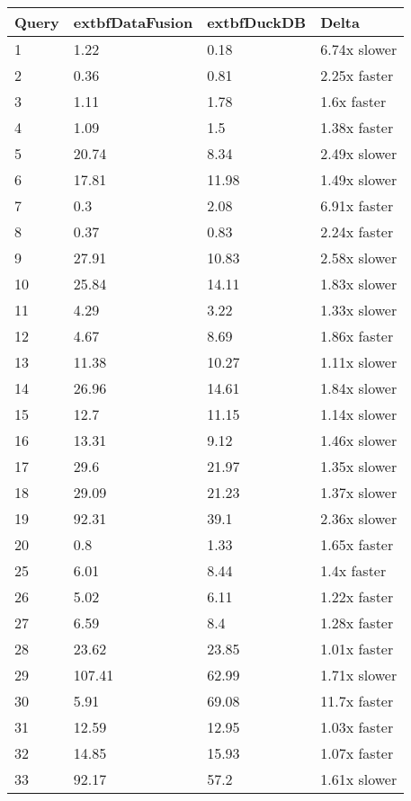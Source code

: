 \begin{table}[h]
\centering
\begin{tabular}{|l|l|l|l|}
\hline
Query & 	extbf{DataFusion} & 	extbf{DuckDB} & Delta \\
\hline
1 & 1.22 & 0.18 & 6.74x slower \\
\hline
2 & 0.36 & 0.81 & 2.25x faster \\
\hline
3 & 1.11 & 1.78 & 1.6x faster \\
\hline
4 & 1.09 & 1.5 & 1.38x faster \\
\hline
5 & 20.74 & 8.34 & 2.49x slower \\
\hline
6 & 17.81 & 11.98 & 1.49x slower \\
\hline
7 & 0.3 & 2.08 & 6.91x faster \\
\hline
8 & 0.37 & 0.83 & 2.24x faster \\
\hline
9 & 27.91 & 10.83 & 2.58x slower \\
\hline
10 & 25.84 & 14.11 & 1.83x slower \\
\hline
11 & 4.29 & 3.22 & 1.33x slower \\
\hline
12 & 4.67 & 8.69 & 1.86x faster \\
\hline
13 & 11.38 & 10.27 & 1.11x slower \\
\hline
14 & 26.96 & 14.61 & 1.84x slower \\
\hline
15 & 12.7 & 11.15 & 1.14x slower \\
\hline
16 & 13.31 & 9.12 & 1.46x slower \\
\hline
17 & 29.6 & 21.97 & 1.35x slower \\
\hline
18 & 29.09 & 21.23 & 1.37x slower \\
\hline
19 & 92.31 & 39.1 & 2.36x slower \\
\hline
20 & 0.8 & 1.33 & 1.65x faster \\
\hline
25 & 6.01 & 8.44 & 1.4x faster \\
\hline
26 & 5.02 & 6.11 & 1.22x faster \\
\hline
27 & 6.59 & 8.4 & 1.28x faster \\
\hline
28 & 23.62 & 23.85 & 1.01x faster \\
\hline
29 & 107.41 & 62.99 & 1.71x slower \\
\hline
30 & 5.91 & 69.08 & 11.7x faster \\
\hline
31 & 12.59 & 12.95 & 1.03x faster \\
\hline
32 & 14.85 & 15.93 & 1.07x faster \\
\hline
33 & 92.17 & 57.2 & 1.61x slower \\

\end{tabular}
\end{table}
